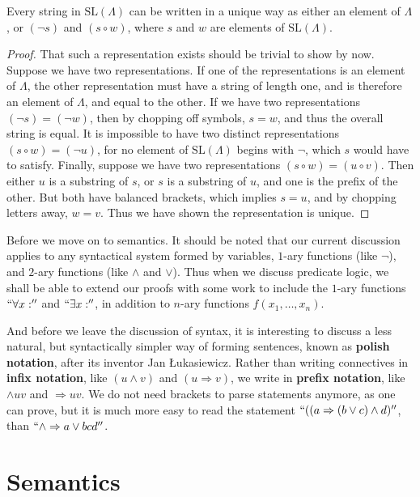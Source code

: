 \begin{corollary}
    Every string in $\text{SL}(\Lambda)$ can be written in a unique way as either an element of $\Lambda$, or $(\neg s)$ and $(s \circ w)$, where $s$ and $w$ are elements of $\text{SL}(\Lambda)$.
\end{corollary}
\begin{proof}
    That such a representation exists should be trivial  to show by now. Suppose we have two representations. If one of the representations is an element of $\Lambda$, the other representation must have a string of length one, and is therefore an element of $\Lambda$, and equal to the other. If we have two representations $(\neg s) = (\neg w)$, then by chopping off symbols, $s = w$, and thus the overall string is equal. It is impossible to have two distinct representations $(s \circ w) = (\neg u)$, for no element of $\text{SL}(\Lambda)$ begins with $\neg$, which $s$ would have to satisfy. Finally, suppose we have two representations $(s \circ w) = (u \circ v)$. Then either $u$ is a substring of $s$, or $s$ is a substring of $u$, and one is the prefix of the other. But both have balanced brackets, which implies $s = u$, and by chopping letters away, $w = v$. Thus we have shown the representation is unique.
\end{proof}

Before we move on to semantics. It should be noted that our current discussion applies to any syntactical system formed by variables, $1$-ary functions (like $\neg$), and $2$-ary functions (like $\wedge$ and $\vee$). Thus when we discuss predicate logic, we shall be able to extend our proofs with some work to include the $1$-ary functions $``\forall x:''$ and $``\exists x:''$, in addition to $n$-ary functions $f(x_1, \dots, x_n)$.

And before we leave the discussion of syntax, it is interesting to discuss a less natural, but syntactically simpler way of forming sentences, known as {\bf polish notation}, after its inventor Jan \L ukasiewicz. Rather than writing connectives in {\bf infix notation}, like $(u \wedge v)$ and $(u \Rightarrow v)$, we write in {\bf prefix notation}, like $\wedge u v$ and $\Rightarrow u v$. We do not need brackets to parse statements anymore, as one can prove, but it is much more easy to read the statement $``((a \Rightarrow (b \vee c) \wedge d)''$, than $``\wedge \Rightarrow a \vee b c d''$.

\section{Semantics}

